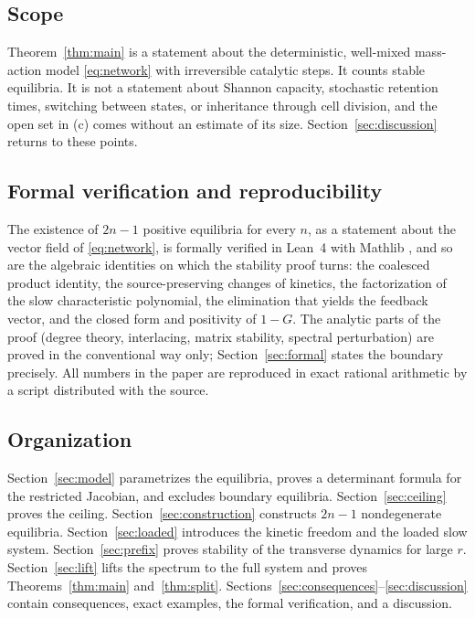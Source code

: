 \documentclass[11pt]{article}
\theoremstyle{plain}
\theoremstyle{definition}
\theoremstyle{remark}
\numberwithin{equation}{section}
\begin{document}
\subsection{Scope}
Theorem~\ref{thm:main} is a statement about the deterministic, well-mixed mass-action model
\eqref{eq:network} with irreversible catalytic steps. It counts stable equilibria. It is not a
statement about Shannon capacity, stochastic retention times, switching between states, or
inheritance through cell division, and the open set in (c) comes without an estimate of its
size. Section~\ref{sec:discussion} returns to these points.

\subsection{Formal verification and reproducibility}
The existence of \(2n-1\) positive equilibria for every \(n\), as a statement about the vector
field of \eqref{eq:network}, is formally verified in Lean~4 \cite{Lean4} with Mathlib
\cite{Mathlib}, and so are the algebraic identities on which the stability proof turns: the
coalesced product identity, the source-preserving changes of kinetics, the factorization of
the slow characteristic polynomial, the elimination that yields the feedback vector, and the
closed form and positivity of \(1-G\). The analytic parts of the proof (degree theory,
interlacing, matrix stability, spectral perturbation) are proved in the conventional way only;
Section~\ref{sec:formal} states the boundary precisely. All numbers in the paper are reproduced
in exact rational arithmetic by a script distributed with the source.

\subsection{Organization}
Section~\ref{sec:model} parametrizes the equilibria, proves a determinant formula for the
restricted Jacobian, and excludes boundary equilibria. Section~\ref{sec:ceiling} proves the
ceiling. Section~\ref{sec:construction} constructs \(2n-1\) nondegenerate equilibria.
Section~\ref{sec:loaded} introduces the kinetic freedom and the loaded slow system.
Section~\ref{sec:prefix} proves stability of the transverse dynamics for large \(r\).
Section~\ref{sec:lift} lifts the spectrum to the full system and proves
Theorems~\ref{thm:main} and~\ref{thm:split}. Sections~\ref{sec:consequences}--\ref{sec:discussion}
contain consequences, exact examples, the formal verification, and a discussion.







\end{document}
